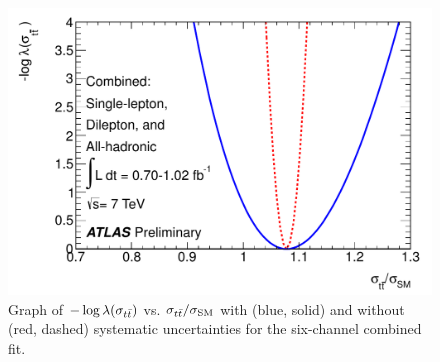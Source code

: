 



\begin{figure}[ht!]
  \begin{center}
    \includegraphics[width=.7\textwidth]{figures/comb/fullcombined_likelihood_curve}
    \caption{Graph of $-\log\lambda(\sigma_{t\bar{t}})$ vs. $\sigma_{t\bar{t}}/\sigma_{\rm SM}$ with (blue, solid) and without (red, dashed) systematic uncertainties for the six-channel combined fit.}
    \label{fig:fullcombined_likelihood_curve}
  \end{center}
\end{figure}
